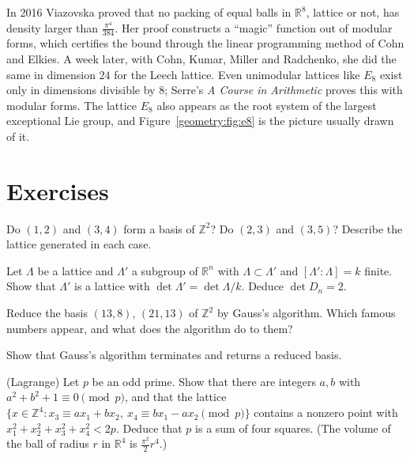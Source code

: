 \begin{remark}
In 2016 Viazovska proved that no packing of equal balls in $\mathbb R^8$, lattice or not, has density larger than $\frac{\pi^4}{384}$. Her proof constructs a
``magic'' function out of modular forms, which certifies the bound through the linear programming method of Cohn and Elkies. A week later, with Cohn,
Kumar, Miller and Radchenko, she did the same in dimension $24$ for the Leech lattice. Even unimodular lattices like $E_8$ exist only in dimensions divisible
by $8$; Serre's \emph{A Course in Arithmetic} proves this with modular forms. The lattice $E_8$ also appears as the root system of the largest exceptional Lie
group, and Figure~\ref{geometry:fig:e8} is the picture usually drawn of it.
\end{remark}

\section{Exercises}

\begin{exercise}[$\star$]\label{geometry:ex:basisZ2}
Do $(1,2)$ and $(3,4)$ form a basis of $\mathbb Z^2$? Do $(2,3)$ and $(3,5)$? Describe the lattice generated in each case.
\end{exercise}

\begin{exercise}[$\star$]\label{geometry:ex:index}
Let $\Lambda$ be a lattice and $\Lambda'$ a subgroup of $\mathbb R^n$ with $\Lambda\subset\Lambda'$ and $[\Lambda':\Lambda]=k$ finite. Show that $\Lambda'$ is a
lattice with $\det\Lambda'=\det\Lambda/k$. Deduce $\det D_n=2$.
\end{exercise}

\begin{exercise}[$\star$]\label{geometry:ex:gaussreduce}
Reduce the basis $(13,8)$, $(21,13)$ of $\mathbb Z^2$ by Gauss's algorithm. Which famous numbers appear, and what does the algorithm do to them?
\end{exercise}

\begin{exercise}[$\star\star$]\label{geometry:ex:gaussterminates}
Show that Gauss's algorithm terminates and returns a reduced basis.
\end{exercise}

\begin{exercise}[$\star\star$]\label{geometry:ex:foursquares}
(Lagrange) Let $p$ be an odd prime. Show that there are integers $a,b$ with $a^2+b^2+1\equiv0\pmod p$, and that the lattice
$\{x\in\mathbb Z^4:x_3\equiv ax_1+bx_2,\ x_4\equiv bx_1-ax_2\pmod p\}$ contains a nonzero point with $x_1^2+x_2^2+x_3^2+x_4^2<2p$. Deduce that $p$ is a sum
of four squares. (The volume of the ball of radius $r$ in $\mathbb R^4$ is $\frac{\pi^2}2r^4$.)
\end{exercise}

